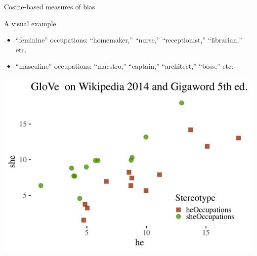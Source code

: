 \documentclass[
  10pt,
  ignorenonframetext,
  x11names, dvipsnames, bibspacing,natbib, table]{beamer}
\begin{document}
\begin{frame}{Cosine-based measures of bias}
\protect\hypertarget{cosine-based-measures-of-bias-1}{}
\begin{block}{A visual example}
\protect\hypertarget{a-visual-example}{}
\footnotesize

\begin{itemize}
\item
  ``feminine'' occupations: ``homemaker,'' ``nurse,'' ``receptionist,''
  ``librarian,'' etc.
\item
  ``masculine'' occupations: ``maestro,'' ``captain,'' ``architect,''
  ``boss,'' etc.
\end{itemize}

\normalsize

\vspace{1mm}
\footnotesize

\begin{center}\includegraphics[width=0.6\linewidth]{presentationBoston_files/figure-beamer/unnamed-chunk-1-1} \end{center}
\normalsize
\end{block}
\end{frame}
\end{document}
